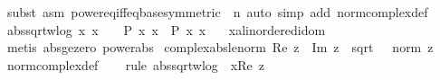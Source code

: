 \begin{isabellebody}
\isatagproof
{}\isamarkupfalse%
\ {\isacharparenleft}{\kern0pt}subst\ {\isacharparenleft}{\kern0pt}asm{\isacharparenright}{\kern0pt}\ power{\isacharunderscore}{\kern0pt}eq{\isacharunderscore}{\kern0pt}iff{\isacharunderscore}{\kern0pt}eq{\isacharunderscore}{\kern0pt}base{\isacharbrackleft}{\kern0pt}symmetric{\isacharcomma}{\kern0pt}\ \ n{\isacharequal}{\kern0pt}{}{\isacharbrackright}{\kern0pt}{\isacharparenright}{\kern0pt}\ {\isacharparenleft}{\kern0pt}auto\ simp\ add{\isacharcolon}{\kern0pt}\ norm{\isacharunderscore}{\kern0pt}complex{\isacharunderscore}{\kern0pt}def{\isacharparenright}{\kern0pt}%
\endisatagproof
{\isafoldproof}%
%
\isadelimproof
\isanewline
%
\endisadelimproof
\isanewline
{}\isamarkupfalse%
\ abs{\isacharunderscore}{\kern0pt}sqrt{\isacharunderscore}{\kern0pt}wlog{\isacharcolon}{\kern0pt}\ {\isachardoublequoteopen}{\isacharparenleft}{\kern0pt}{\isasymAnd}x{\isachardot}{\kern0pt}\ x\ {\isasymge}\ {}\ {\isasymLongrightarrow}\ P\ x\ {\isacharparenleft}{\kern0pt}x\ {\isasymLongrightarrow}\ P\ {\isasymbar}x{\isasymbar}\ {\isacharparenleft}{\kern0pt}x\isanewline
\ \ \ x{\isacharcolon}{\kern0pt}{\isacharcolon}{\kern0pt}{\isachardoublequoteopen}{\isacharprime}{\kern0pt}a{\isacharcolon}{\kern0pt}{\isacharcolon}{\kern0pt}linordered{\isacharunderscore}{\kern0pt}idom{\isachardoublequoteclose}\isanewline
%
\isadelimproof
\ \ %
\endisadelimproof
%
\isatagproof
{}\isamarkupfalse%
\ {\isacharparenleft}{\kern0pt}metis\ abs{\isacharunderscore}{\kern0pt}ge{\isacharunderscore}{\kern0pt}zero\ power{}{\isacharunderscore}{\kern0pt}abs{\isacharparenright}{\kern0pt}%
\endisatagproof
{\isafoldproof}%
%
\isadelimproof
\isanewline
%
\endisadelimproof
\isanewline
{}\isamarkupfalse%
\ complex{\isacharunderscore}{\kern0pt}abs{\isacharunderscore}{\kern0pt}le{\isacharunderscore}{\kern0pt}norm{\isacharcolon}{\kern0pt}\ {\isachardoublequoteopen}{\isasymbar}Re\ z{\isasymbar}\ {\isacharplus}{\kern0pt}\ {\isasymbar}Im\ z{\isasymbar}\ {\isasymle}\ sqrt\ {}\ {\isacharasterisk}{\kern0pt}\ norm\ z{\isachardoublequoteclose}\isanewline
%
\isadelimproof
\ \ %
\endisadelimproof
%
\isatagproof
{}\isamarkupfalse%
\ norm{\isacharunderscore}{\kern0pt}complex{\isacharunderscore}{\kern0pt}def\isanewline
\ \ \isamarkupfalse%
\ {\isacharparenleft}{\kern0pt}rule\ abs{\isacharunderscore}{\kern0pt}sqrt{\isacharunderscore}{\kern0pt}wlog\ {\isacharbrackleft}{\kern0pt}\ x{\isacharequal}{\kern0pt}{\isachardoublequoteopen}Re\ z{\isachardoublequoteclose}{\isacharbrackright}{\kern0pt}{\isacharparenright}{\kern0pt}\isanewline

\end{isabellebody}
